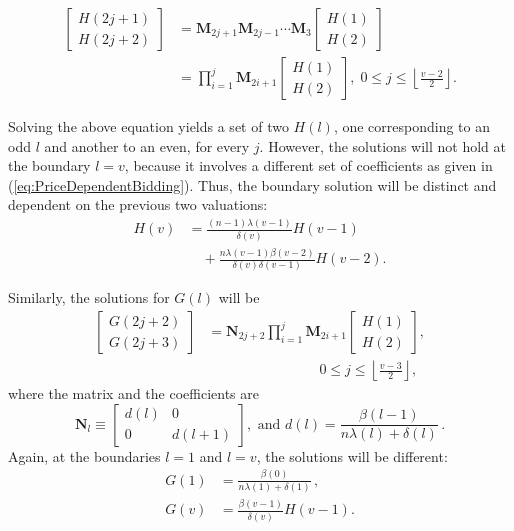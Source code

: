 \documentclass{article}
\begin{document}
\begin{align}\label{eq:PriceDependent_Hl}
\begin{bmatrix} H(2j+1)\\
H(2j+2) \end{bmatrix} &= \mathbf{M}_{2j+1} \mathbf{M}_{2j-1}
\cdots \mathbf{M}_{3}
\begin{bmatrix}H(1)\\
H(2) \end{bmatrix} \\
&= \prod_{i=1}^{j} \mathbf{M}_{2i+1}
\begin{bmatrix}H(1)\\
H(2) \end{bmatrix} , \; 0\leq j \leq \left\lfloor\frac{v-2}{2}
\right\rfloor\nonumber .
\end{align}

Solving the above equation yields a set of two $H(l)$, one
corresponding to an odd $l$ and another to an even, for every $j$.
However, the solutions will not hold at the boundary $l=v$,
because it involves a different set of coefficients as given in
(\ref{eq:PriceDependentBidding}). Thus, the boundary solution will
be distinct and dependent on the previous two valuations:
\begin{equation}\label{eq:PriceDependent_Hl_Boundary}
\begin{split}
H(v) &= \frac{(n-1)\lambda(v-1)}{\delta(v)} H(v-1) \\
&\quad +
\frac{n\lambda(v-1)\beta(v-2)}{\delta(v)\delta(v-1)}H(v-2).
\end{split}
\end{equation}

Similarly, the solutions for $G(l)$ will be
\begin{equation} \label{eq:PriceDependent_Gl}
\begin{split}
\begin{bmatrix}  G(2j+2)\\
G(2j+3) \end{bmatrix} &= \mathbf{N}_{2j+2} \prod_{i=1}^{j}
\mathbf{M}_{2i+1}
\begin{bmatrix} H(1)\\
H(2)\end{bmatrix} , \\
&\qquad\qquad\qquad\qquad  0\leq j \leq \left\lfloor\frac{v-3}{2}
\right\rfloor ,
\end{split}
\end{equation}
where the matrix and the coefficients are
\begin{equation}
\mathbf{N}_l \equiv \begin{bmatrix} d(l) & 0 \\
0 & d(l+1)\end{bmatrix},  \textrm{ and }  d(l) =
\frac{\beta(l-1)}{n\lambda(l)+\delta(l)}\,.
\end{equation}
Again, at the boundaries $l=1$ and $l=v$, the solutions will be
different:
\begin{align}\label{eq:PriceDependent_Gl_Boundary}
G(1) &= \frac{\beta(0)}{n\lambda(1)+\delta(1)}\,,\\
G(v) &= \frac{\beta(v-1)}{\delta(v)} H(v-1) . \nonumber
\end{align}
\end{document}
